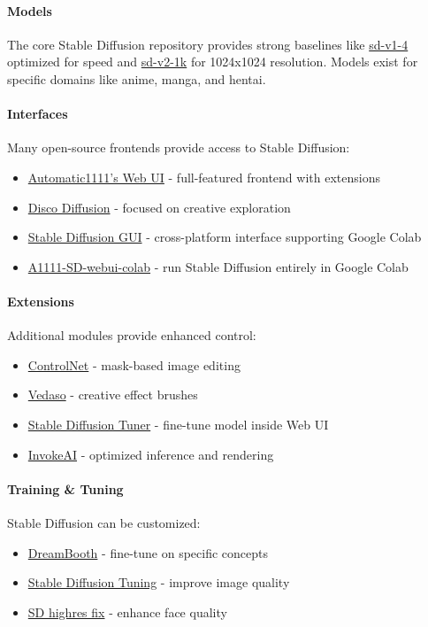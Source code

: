 \paragraph{Models} The core Stable Diffusion repository provides strong baselines like \href{https://github.com/CompVis/stable-diffusion}{sd-v1-4} optimized for speed and \href{https://github.com/Stability-AI/stablediffusion}{sd-v2-1k} for 1024x1024 resolution. Models exist for specific domains like anime, manga, and hentai.

\paragraph{Interfaces} Many open-source frontends provide access to Stable Diffusion:
\begin{itemize}
\item \href{https://github.com/AUTOMATIC1111/stable-diffusion-webui}{Automatic1111's Web UI} - full-featured frontend with extensions
\item \href{https://github.com/alembics/disco-diffusion}{Disco Diffusion} - focused on creative exploration
\item \href{https://github.com/hlky/stable-diffusion}{Stable Diffusion GUI} - cross-platform interface supporting Google Colab
\item \href{https://github.com/invincible-sam/A1111-SD-webui-colab}{A1111-SD-webui-colab} - run Stable Diffusion entirely in Google Colab
\end{itemize}

\paragraph{Extensions} Additional modules provide enhanced control:
\begin{itemize}
\item \href{https://github.com/lllyasviel/ControlNet}{ControlNet} - mask-based image editing
\item \href{https://github.com/alembics/vedaso}{Vedaso} - creative effect brushes
\item \href{https://github.com/camenduru/stable-diffusion-webui-tuner}{Stable Diffusion Tuner} - fine-tune model inside Web UI
\item \href{https://github.com/invoke-ai/InvokeAI}{InvokeAI} - optimized inference and rendering
\end{itemize}

\paragraph{Training \& Tuning} Stable Diffusion can be customized:
\begin{itemize}
\item \href{https://github.com/Stability-AI/dreambooth}{DreamBooth} - fine-tune on specific concepts
\item \href{https://github.com/yfszzx/stable-diffusion-stability-ai}{Stable Diffusion Tuning} - improve image quality
\item \href{https://github.com/d8ahazard/sd_hires_face_fix}{SD highres fix} - enhance face quality
\end{itemize}

